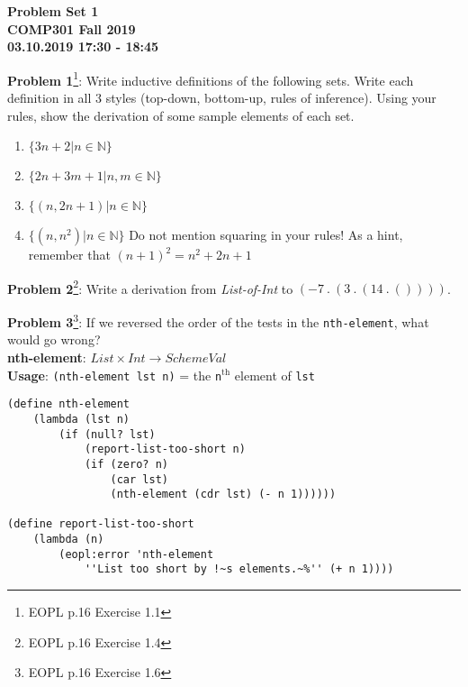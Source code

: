 \documentclass[12pt,reqno]{amsart}
\newcommand{\code}[1]{\texttt{#1}}
\begin{document}
\begin{center}
\large\textbf{Problem Set 1 \\ COMP301 Fall 2019} \\
\normalsize\textbf{03.10.2019 17:30 - 18:45} \\
\end{center}

\vspace{7.5mm}

\textbf{Problem 1}\footnote{EOPL p.16 Exercise 1.1}: Write inductive definitions of the following sets. Write each definition in all 3 styles (top-down, bottom-up, rules of inference). Using your rules, show the derivation of some sample elements of each set.
\begin{enumerate}
	\item $\{3n+2 | n \in \mathbb{N}\}$
	\item $\{2n + 3m + 1 | n, m \in \mathbb{N}\}$
	\item $\{(n, 2n+1) | n \in \mathbb{N}\}$
	\item $\{(n, n^2) | n \in \mathbb{N} \}$ Do not mention squaring in your rules! As a hint, remember that $(n+1)^2 = n^2 + 2n + 1$
\end{enumerate}

\vspace{7.5mm}

\textbf{Problem 2}\footnote{EOPL p.16 Exercise 1.4}: Write a derivation from \textit{List-of-Int} to $(-7 \ .\  (3 \ .\  (14 \ .\  ())))$.

\vspace{7.5mm}

\textbf{Problem 3}\footnote{EOPL p.16 Exercise 1.6}: If we reversed the order of the tests in the \code{nth-element}, what would go wrong? \\
\textbf{nth-element}: $List \times Int \xrightarrow{} SchemeVal$ \\
\textbf{Usage}: \code{(nth-element lst n)} = the \code{n}$^\text{th}$ element of \code{lst}
\begin{lstlisting}
(define nth-element
    (lambda (lst n)
        (if (null? lst)
            (report-list-too-short n)
            (if (zero? n)
                (car lst)
                (nth-element (cdr lst) (- n 1))))))
                
(define report-list-too-short
    (lambda (n)
        (eopl:error 'nth-element
            ''List too short by !~s elements.~%'' (+ n 1))))
\end{lstlisting}
\end{document}
